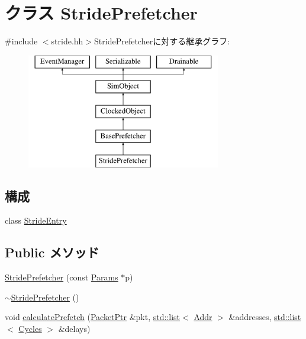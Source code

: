 \hypertarget{classStridePrefetcher}{
\section{クラス StridePrefetcher}
\label{classStridePrefetcher}
}


{\ttfamily \#include $<$stride.hh$>$}StridePrefetcherに対する継承グラフ:\begin{figure}[H]
\begin{center}
\leavevmode
\includegraphics[height=5cm]{classStridePrefetcher}
\end{center}
\end{figure}
\subsection*{構成}
\begin{DoxyCompactItemize}
\item 
class \hyperlink{classStridePrefetcher_1_1StrideEntry}{StrideEntry}
\end{DoxyCompactItemize}
\subsection*{Public メソッド}
\begin{DoxyCompactItemize}
\item 
\hyperlink{classStridePrefetcher_ad4f8b8679818dea805237ad9617e3f51}{StridePrefetcher} (const \hyperlink{classBasePrefetcher_a46661f02a5642b04fd4e12f645ad9c5c}{Params} $\ast$p)
\item 
\hyperlink{classStridePrefetcher_ab40ed6a991c78a4fecd687df2ba79582}{$\sim$StridePrefetcher} ()
\item 
void \hyperlink{classStridePrefetcher_a1cc3d838a8314074cfda794f18eb6de9}{calculatePrefetch} (\hyperlink{classPacket}{PacketPtr} \&pkt, \hyperlink{classstd_1_1list}{std::list}$<$ \hyperlink{base_2types_8hh_af1bb03d6a4ee096394a6749f0a169232}{Addr} $>$ \&addresses, \hyperlink{classstd_1_1list}{std::list}$<$ \hyperlink{classCycles}{Cycles} $>$ \&delays)
\end{DoxyCompactItemize}
